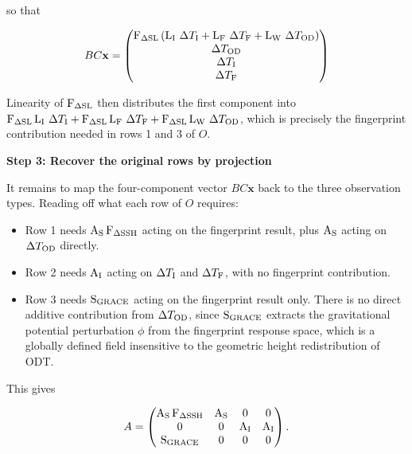 so that

\begin{equation}
    BC\mathbf{x} = \begin{pmatrix}
        \operatorname{{F}}_{{\Delta \mathrm{SL}}}\left(\operatorname{{L}}_{{\text{I}}}\,\Delta T_\text{I} + \operatorname{{L}}_{{\text{F}}}\,\Delta T_\text{F} + \operatorname{{L}}_{{\text{W}}}\,\Delta T_\text{OD}\right) \\
        \Delta T_\text{OD} \\
        \Delta T_\text{I} \\
        \Delta T_\text{F}
    \end{pmatrix}
\end{equation}

Linearity of $\operatorname{{F}}_{{\Delta \mathrm{SL}}}$ then distributes the first component into
$\operatorname{{F}}_{{\Delta \mathrm{SL}}}\operatorname{{L}}_{{\text{I}}}\,\Delta T_\text{I} + \operatorname{{F}}_{{\Delta \mathrm{SL}}}\operatorname{{L}}_{{\text{F}}}\,\Delta T_\text{F}
+ \operatorname{{F}}_{{\Delta \mathrm{SL}}}\operatorname{{L}}_{{\text{W}}}\,\Delta T_\text{OD}$, which is precisely the fingerprint contribution
needed in rows 1 and 3 of $O$.

\textbf{Step 3: Recover the original rows by projection}

It remains to map the four-component vector $BC\mathbf{x}$ back to the three observation types.
Reading off what each row of $O$ requires:
\begin{itemize}
    \item Row 1 needs $\operatorname{{A}}_{{\mathrm{S}}} \operatorname{{F}}_{{\Delta \mathrm{SSH}}}$ acting on the fingerprint result, plus $\operatorname{{A}}_{{\mathrm{S}}}$ acting on $\Delta T_\text{OD}$ directly.
    \item Row 2 needs $\operatorname{{A}}_{{\mathrm{I}}}$ acting on $\Delta T_\text{I}$ and $\Delta T_\text{F}$, with no fingerprint contribution.
    \item Row 3 needs $\operatorname{{S}}_{{\mathrm{GRACE}}}$ acting on the fingerprint result only. There is no direct additive contribution from $\Delta T_\text{OD}$, since $\operatorname{{S}}_{{\mathrm{GRACE}}}$ extracts the gravitational potential perturbation $\phi$ from the fingerprint response space, which is a globally defined field insensitive to the geometric height redistribution of ODT.
\end{itemize}

This gives

\begin{equation}
    A = \begin{pmatrix}
        \operatorname{{A}}_{{\mathrm{S}}} \operatorname{{F}}_{{\Delta \mathrm{SSH}}} & \operatorname{{A}}_{{\mathrm{S}}} & 0 & 0 \\
        0 & 0 & \operatorname{{A}}_{{\mathrm{I}}} & \operatorname{{A}}_{{\mathrm{I}}} \\
        \operatorname{{S}}_{{\mathrm{GRACE}}} & 0 & 0 & 0
    \end{pmatrix}.
\end{equation}

